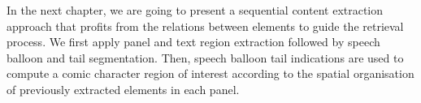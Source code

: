
In the next chapter, we are going to present a sequential content extraction approach that profits from the relations between elements to guide the retrieval process.
We first apply panel and text region extraction followed by speech balloon and tail segmentation.
Then, speech balloon tail indications are used to compute a comic character region of interest according to the spatial organisation of previously extracted elements in each panel.




